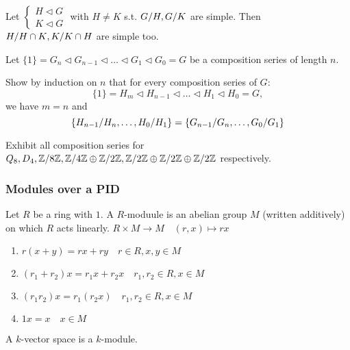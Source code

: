 \begin{exercise}
  Let $\begin{cases}
    H \lhd G \\
    K \lhd G
  \end{cases}$ with $H \ne K$ s.t. ${G}/{H}, {G}/{K}$ are simple.
  Then ${H}/{H\cap K}, {K}/{K \cap H}$ are simple too.
\end{exercise}

\begin{exercise}
  Let $\{1\} = G_n \lhd G_{n-1} \lhd \dots \lhd G_1 \lhd G_0 = G$ be a
  composition series of length $n$.

  Show by induction on $n$ that for every composition series of $G$:
  \[
    \{1\} = H_m \lhd H_{n-1} \lhd \dots \lhd H_1 \lhd H_0 = G,
  \]
  we have $m = n$ and
  \[
    \left\{
      {H_{n-1}}/{H_n}, \dots, {H_0}/{H_1}
    \right\} =
    \left\{
      {G_{n-1}}/{G_n}, \dots, {G_0}/{G_1}
    \right\}
  \]

\end{exercise}

\begin{exercise}
  Exhibit all composition series for
  $Q_8, D_4, {\mathbb{Z}}/{8\mathbb{Z}}, {\mathbb{Z}}/{4\mathbb{Z}} \oplus {\mathbb{Z}}/{2\mathbb{Z}},
  {\mathbb{Z}}/{2\mathbb{Z}} \oplus {\mathbb{Z}}/{2\mathbb{Z}} \oplus {\mathbb{Z}}/{2\mathbb{Z}}$
  respectively.
\end{exercise}

\subsubsection{Modules over a PID}

\begin{definition}
  Let $R$ be a ring with $1$. A $R$-moduule is an abelian group $M$
  (written additively) on which $R$ acts linearly.
  $R \times M \to M \quad (r, x) \mapsto rx$
  \begin{enumerate}
    \item $r(x + y) = rx + ry \quad r \in R, x, y \in M$
    \item $(r_1 + r_2)x = r_1x + r_2x \quad r_1, r_2 \in R, x \in M$
    \item $(r_1r_2)x = r_1(r_2x) \quad r_1, r_2 \in R, x \in M$
    \item $1x = x \quad x \in M$
  \end{enumerate}
\end{definition}

\begin{example}
  A $k$-vector space is a $k$-module.
\end{example}


